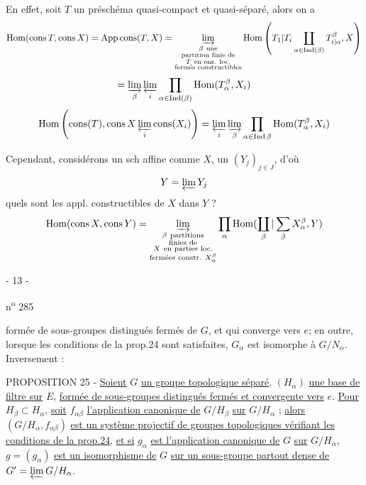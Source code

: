En effet, soit $T$ un préschéma quasi-compact et quasi-séparé, alors on a
\[
\operatorname{Hom}(\operatorname{cons}T,\operatorname{cons}X)
=\operatorname{App\,cons}(T,X)
=\varinjlim_{\substack{\beta\ \text{une}\\\text{partition finie de}\\T\ \text{en ens. loc.}\\\text{fermés constructibles}}}
\operatorname{Hom}\left(\deleted{\unsure{T_1|T_i}}\coprod_{\alpha\in\operatorname{Ind}(\beta)}T_{\unsure{i|\alpha}}^\beta,X\right)
\]
\[
=\varinjlim_\beta\varprojlim_i\prod_{\alpha\in\operatorname{Ind}(\beta)}\operatorname{Hom}(T_\alpha^\beta,X_i)
\]
\[
\operatorname{Hom}\left(\operatorname{cons}(T),\operatorname{cons}X\varprojlim_i\operatorname{cons}(X_i)\right)
=\varprojlim_i\varinjlim_\beta\prod_{\alpha\in\operatorname{Ind}\beta}\operatorname{Hom}(T_\alpha^\beta,X_i)
\]

Cependant, considérons un sch affine comme $X$, un $(Y_j)_{j\in J}$, d'où
\[
Y=\varprojlim Y_j
\]
quels sont les  appl. constructibles de $X$ dans $Y$ ? 
\[
\operatorname{Hom}(\operatorname{cons}X,\operatorname{cons}Y)
=\varinjlim_{\substack{\beta\ \text{partitions}\\\text{finies de}\\X\ \text{en parties loc.}\\\text{fermées constr.}\ X_\alpha^\beta}}
\prod_\alpha\operatorname{Hom}(\deleted{\unsure{\coprod_\beta|\sum_\beta}}X_\alpha^\beta,Y)
\]

\begin{center}- 13 -\end{center}
\hfill n\textsuperscript{o} 285

formée de sous-groupes distingués fermés de $G$, et qui converge vers $e$; en outre, lorsque les conditions de la prop.24 sont satisfaites, $G_\alpha$ est isomorphe à $G/N_\alpha$. Inversement :

PROPOSITION 25 - \uline{Soient} $G$ \uline{un groupe topologique séparé}, $(H_\alpha)$ \uline{une base de filtre sur} $E$, \uline{formée de sous-groupes distingués fermés et convergente vers} $e$. \uline{Pour} $H_\beta\subset H_\alpha$, \uline{soit} $f_{\alpha\beta}$ \uline{l'application canonique de} $G/H_\beta$ \uline{sur} $G/H_\alpha$ ; \uline{alors} $(G/H_\alpha,f_{\alpha\beta})$ \uline{est un système projectif de groupes topologiques vérifiant les conditions de la prop.24}, \uline{et si} $g_\alpha$ \uline{est l'application canonique de} $G$ \uline{sur} $G/H_\alpha$, $g=(g_\alpha)$ \uline{est un isomorphisme de} $G$ \uline{sur un sous-groupe partout dense de} $G'=\varprojlim G/H_\alpha$.

